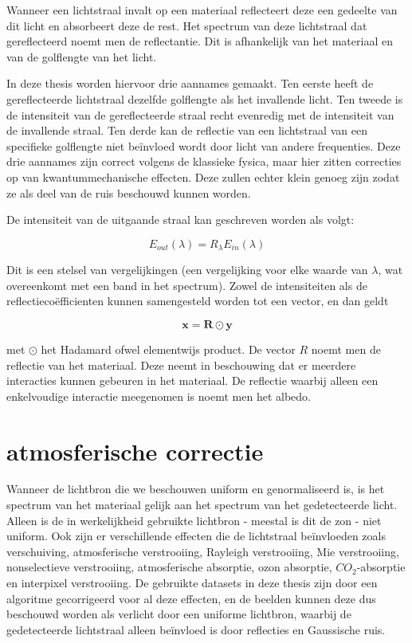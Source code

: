 \documentclass[12pt]{report}
\begin{document}
Wanneer een lichtstraal invalt op een materiaal reflecteert deze een gedeelte van dit licht en absorbeert deze de rest. Het spectrum van deze lichtstraal dat gereflecteerd noemt men de reflectantie. Dit is afhankelijk van het materiaal en van de golflengte van het licht. 

In deze thesis worden hiervoor drie aannames gemaakt. Ten eerste heeft de gereflecteerde lichtstraal dezelfde golflengte als het invallende licht. Ten tweede is de intensiteit van de gereflecteerde straal recht evenredig met de intensiteit van de invallende straal. Ten derde kan de reflectie van een lichtstraal van een specifieke golflengte niet be\"invloed wordt door licht van andere frequenties. Deze drie aannames zijn correct volgens de klassieke fysica, maar hier zitten correcties op van kwantummechanische effecten. Deze zullen echter klein genoeg zijn zodat ze als deel van de ruis beschouwd kunnen worden.

De intensiteit van de uitgaande straal kan geschreven worden als volgt:

\begin{equation}
E_{out}(\lambda) = R_\lambda E_{in}(\lambda)
\end{equation}

Dit is een stelsel van vergelijkingen (een vergelijking voor elke waarde van $\lambda$, wat overeenkomt met een band in het spectrum). Zowel de intensiteiten als de reflectieco\"efficienten kunnen samengesteld worden tot een vector, en dan geldt

\begin{equation}
\bm{x} = \bm{R}\odot \bm{y}
\end{equation}

met $\odot$ het Hadamard ofwel elementwijs product. De vector $R$ noemt men de reflectie van het materiaal. Deze neemt in beschouwing dat er meerdere interacties kunnen gebeuren in het materiaal. De reflectie waarbij alleen een enkelvoudige interactie meegenomen is noemt men het albedo.


\section{atmosferische correctie}

Wanneer de lichtbron die we beschouwen uniform en genormaliseerd is, is het spectrum van het materiaal gelijk aan het spectrum van het gedetecteerde licht. Alleen is de in werkelijkheid gebruikte lichtbron - meestal is dit de zon - niet uniform. Ook zijn er verschillende effecten die de lichtstraal be\"invloeden\cite{fun} zoals verschuiving, atmosferische verstrooiing, Rayleigh verstrooiing, Mie verstrooiing, nonselectieve verstrooiing, atmosferische absorptie, ozon absorptie, $CO_2$-absorptie en interpixel verstrooiing. De gebruikte datasets in deze thesis zijn door een algoritme gecorrigeerd voor al deze effecten, en de beelden kunnen  deze dus beschouwd worden als verlicht door een uniforme lichtbron, waarbij de gedetecteerde lichtstraal alleen be\"invloed is door reflecties en Gaussische ruis. 
\end{document}
